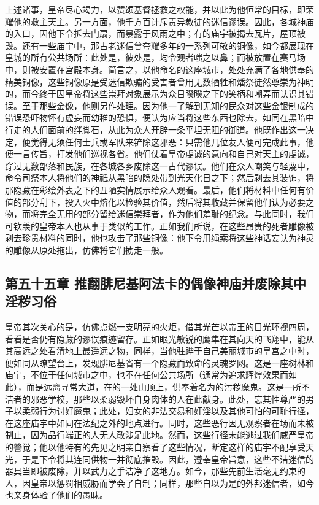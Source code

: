 上述诸事，皇帝尽心竭力，以赞颂基督拯救之权能，并以此为他恒常的目标，即荣耀他的救主天主。另一方面，他千方百计斥责异教徒的迷信谬误。因此，各城神庙的入口，因他下令拆去门扇，而暴露于风雨之中；有的庙宇被揭去瓦片，屋顶被毁。还有一些庙宇中，那古老迷信曾夸耀多年的一系列可敬的铜像，如今都展现在皇城的所有公共场所：此处是，彼处是，均令观者嗤之以鼻；而被放置在赛马场中，则被安置在宫殿本身。简言之，以他命名的这座城市，处处充满了各地供奉的精美铜像，这些铜像原是受迷信欺骗的受害者曾用无数牺牲和燔祭徒然尊崇为神明的，而今终于因皇帝将这些崇拜对象展示为众目睽睽之下的笑柄和嘲弄而认识其错误。至于那些金像，他则另作处理。因为他一了解到无知的民众对这些金银制成的错误恐吓物怀有虚妄而幼稚的恐惧，便认为应当将这些东西也除去，如同在黑暗中行走的人们面前的绊脚石，从此为众人开辟一条平坦无阻的御道。他既作出这一决定，便觉得无须任何士兵或军队来铲除这邪恶：只需他几位友人便可完成此事，他便一言传旨，打发他们巡视各省。他们仗着皇帝虔诚的意向和自己对天主的虔诚，穿过无数部落和民族，在各城各乡废除这一古代谬误。他们在众人嘲笑与轻蔑中，命令司祭本人将他们的神祇从黑暗的隐处带到光天化日之下；然后剥去其装饰，将那隐藏在彩绘外表之下的丑陋实情展示给众人观看。最后，他们将材料中任何有价值的部分刮下，投入火中熔化以检验其价值，然后将其收藏并保留他们认为必要之物，而将完全无用的部分留给迷信崇拜者，作为他们羞耻的纪念。与此同时，我们可钦羡的皇帝本人也从事于类似的工作。正如我们所说，在这些昂贵的死者雕像被剥去珍贵材料的同时，他也攻击了那些铜像：他下令用绳索将这些神话妄认为神灵的雕像从原处拖出，仿佛将它们掳走一般。\par


\subsection{第五十五章 推翻腓尼基阿法卡的偶像神庙并废除其中淫秽习俗}

皇帝其次关心的是，仿佛点燃一支明亮的火炬，借其光芒以帝王的目光环视四周，看看是否仍有隐藏的谬误痕迹留存。正如眼光敏锐的鹰隼在其向天的飞翔中，能从其高远之处看清地上最遥远之物，同样，当他驻跸于自己美丽城市的皇宫之中时，便如同从瞭望台上，发现腓尼基省有一个隐藏而致命的灵魂罗网。这是一座树林和庙宇，不位于任何城市之中，也不在任何公共场所（通常为追求辉煌效果而如此），而是远离寻常大道，在的一处山顶上，供奉着名为的污秽魔鬼。这是一所不洁者的邪恶学校，那些以柔弱毁坏自身肉体的人在此献身。此处，忘其性尊严的男子以柔弱行为讨好魔鬼；此处，妇女的非法交易和奸淫以及其他可怕的可耻行径，在这座庙宇中如同在法纪之外的地点进行。同时，这些恶行因无观察者在场而未被制止，因为品行端正的人无人敢涉足此地。然而，这些行径未能逃过我们威严皇帝的警觉；他以他特有的先见之明亲自察看了这些情况，断定这样的庙宇不配享受天光，于是下令将其连同供物一并彻底摧毁。因此，遵奉皇帝旨意，这些不洁迷信的器具当即被废除，并以武力之手洁净了这地方。如今，那些先前生活毫无约束的人，因皇帝以惩罚相威胁而学会了自制；同样，那些自以为是的外邦迷信者，如今也亲身体验了他们的愚昧。\par

